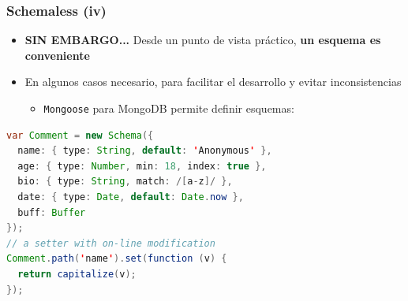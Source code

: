 \documentclass[14pt]{beamer}
\begin{document}
\begin{frame}[fragile]
  \frametitle{Schemaless (iv)}
\begin{itemize}
\item {\bf SIN EMBARGO...} Desde un punto de vista práctico, {\bf un
    esquema es conveniente}
\item En algunos casos necesario, para facilitar el desarrollo y evitar
  inconsistencias
  \begin{itemize}
  \item {\tt Mongoose} para MongoDB permite definir esquemas:
  \end{itemize}
  \end{itemize}
\begin{lstlisting}[language=Java]
var Comment = new Schema({
  name: { type: String, default: 'Anonymous' },
  age: { type: Number, min: 18, index: true },
  bio: { type: String, match: /[a-z]/ },
  date: { type: Date, default: Date.now },
  buff: Buffer
});
// a setter with on-line modification
Comment.path('name').set(function (v) {
  return capitalize(v);
});
\end{lstlisting}

\end{frame}
\end{document}
